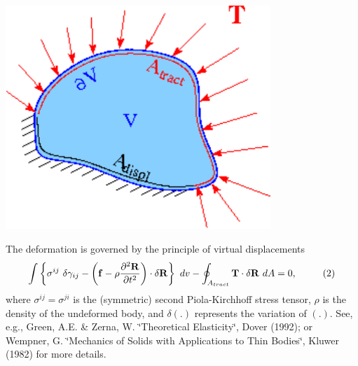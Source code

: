  
\begin{DoxyImage}
\includegraphics[width=0.75\textwidth]{Solid_boundary_conds}
\end{DoxyImage}


The deformation is governed by the principle of virtual displacements \[ \int \left\{ \sigma^{ij} \ \delta \gamma_{ij} - \left( {\bf f} - \rho \frac{\partial^2 {\bf R}}{\partial t^2} \right) \cdot \delta {\bf R} \right\} \ dv - \oint_{A_{tract}} {\bf T} \cdot \delta {\bf R} \ dA =0, \ \ \ \ \ \ \ \ (2) \] where $ \sigma^{ij} = \sigma^{ji}$ is the (symmetric) second Piola-\/\+Kirchhoff stress tensor, $ \rho $ is the density of the undeformed body, and $ \delta (.) $ represents the variation of $ (.)$. See, e.\+g., Green, A.\+E. \& Zerna, W. \char`\"{}\+Theoretical Elasticity\char`\"{}, Dover (1992); or Wempner, G. \char`\"{}\+Mechanics of Solids with Applications 
 to Thin Bodies\char`\"{}, Kluwer (1982) for more details.

